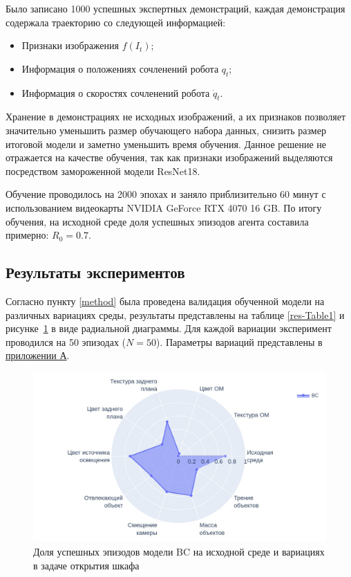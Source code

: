         Было записано 1000 успешных экспертных демонстраций, каждая демонстрация содержала траекторию со следующей информацией:~\begin{itemize}
            \item Признаки изображения $f(I_t)$;
            \item Информация о положениях сочленений робота $q_t$;
            \item Информация о скоростях сочленений робота $\dot{q}_t$.
        \end{itemize}

        Хранение в демонстрациях не исходных изображений, а их признаков позволяет значительно уменьшить размер обучающего набора данных, снизить размер итоговой модели и заметно уменьшить время обучения. Данное решение не отражается на качестве обучения, так как признаки изображений выделяются посредством замороженной модели ResNet18. 

        Обучение проводилось на 2000 эпохах и заняло приблизительно 60 минут с использованием видеокарты NVIDIA GeForce RTX 4070 16 GB. По итогу обучения, на исходной среде доля успешных эпизодов агента составила примерно: $R_0 = 0.7$.

        \subsection{Результаты экспериментов}

            Согласно пункту \ref{method} была проведена валидация обученной модели на различных вариациях среды, результаты представлены на таблице \ref{res-Table1} и рисунке~\ref{fig:sh1} в виде радиальной диаграммы. Для каждой вариации эксперимент проводился на 50 эпизодах ($N = 50$). Параметры вариаций представлены в \hyperref[sec:params]{приложении А}.

            \begin{figure}[h]
                \begin{center}
                    \includegraphics[width=\textwidth]{images/spider_chart_1.jpg}
                \caption{Доля успешных эпизодов модели BC на исходной среде и вариациях в задаче открытия шкафа}
                \label{fig:sh1}
                \end{center}
            \end{figure}


